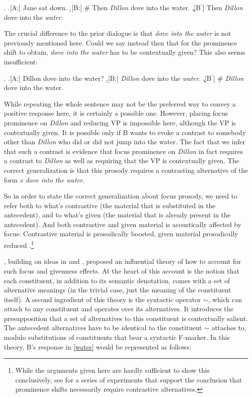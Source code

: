 \documentclass[preprint,review,12pt,authoryear,times]{elsarticle}
\begin{document}
\ex.
\a.[A:] Jane sat down. 
\b.[B:] \# Then {\em Dillon} dove into the water.
\c.[B$^\prime$] Then {\em Dillon} dove into the {\em water}.

The crucial difference to the prior dialogue is that {\em dove into the water} is not previously mentioned here. Could we say instead then that for the prominence shift to obtain, {\em dove into the water} has to be contextually given? This also seems insufficient:

\ex.  
\a.[A:] Dillon dove into the water?
\b.[B:] {\em Dillon} dove into the {\em water}.
\c.[B$^\prime$] \# {\em Dillon} dove into the water.

While repeating the whole sentence may not be the preferred way to convey a positive response here, it is certainly a possible one. However, placing focus prominence on {\em Dillon} and reducing VP is impossible here, although the VP is contextually given. It is possible only if B wants to evoke a contrast to somebody other than {\em Dillon} who did or did not jump into the water. The fact that we infer that such a contrast is evidence that focus prominence on {\em Dillon} in fact requires a contrast to {\em Dillon} as well as requiring that the VP is contextually given. The correct generalization is that this prosody requires a contrasting alternative of the form {\em x dove into the water}. 

So in order to state the correct generalization about focus prosody, we need to refer both to what's contrastive (the material that is substituted in the antecedent), and to what's given (the material that is already present in the antecedent). And both contrastive and given material is acoustically affected by focus: Contrastive material is prosodically boosted, given material prosodically reduced \citep[][i.a.]{eady86,breenetal10}.\footnote{While the arguments given here are hardly sufficient to show this conclusively, see \citet{klassenwagner17} for a series of experiments that support the conclusion that prominence shifts necessarily require contrastive alternatives.} 

\citet{rooth85,rooth92b}, building on ideas in \citet{choms71} and \citet{jacke72}, proposed an influential theory of how to account for such focus and givenness effects. At the heart of this account is the notion that each constituent, in addition to its semantic denotation, comes with a set of alternative meanings (in the trivial case, just the meaning of the constituent itself).
A second ingredient of this theory is the syntactic operator $\sim$, which can attach to any constituent and operates over its alternatives. It introduces the presupposition that a set of alternatives to this constituent is contextually salient. The antecedent alternatives have to be identical to the constituent $\sim$ attaches to, modulo substitutions of constituents that bear a syntactic F-marker. In this theory, B's response in \ref{water} would be represented as follows:
\end{document}
